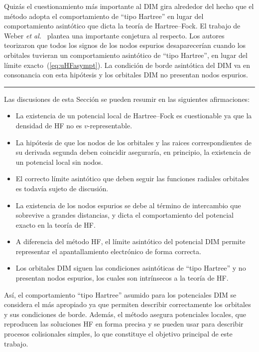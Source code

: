 Quizás el cuestionamiento más importante al DIM gira alrededor del hecho 
que el método adopta el comportamiento de ``tipo Hartree'' en lugar del 
comportamiento asintótico que dicta la teoría de Hartree--Fock. El 
trabajo de Weber \textit{et al.}~\cite{Weber:70} plantea una importante 
conjetura al respecto. Los autores teorizaron que todos los signos de 
los nodos espurios desaparecerían cuando los orbitales tuvieran un 
comportamiento asintótico de ``tipo Hartree'', en lugar del límite 
exacto~(\ref{eq:uHFasympt}). La condición de borde asintótica del DIM 
va en consonancia con esta hipótesis y los orbitales DIM no presentan 
nodos espurios.

\begin{center}
\rule[0.5ex]{0.8\linewidth}{0.5pt}
\end{center}

Las discusiones de esta Sección se pueden resumir en las siguientes 
afirmaciones:
\begin{itemize}
\item La existencia de un potencial local de Hartree--Fock es 
cuestionable ya que la densidad de HF no es $v$-representable.
\item La hipótesis de que los nodos de los orbitales y las raices 
correspondientes de su derivada segunda deben coincidir aseguraría, en 
principio, la existencia de un potencial local sin nodos.
\item El correcto límite asintótico que deben seguir las funciones 
radiales orbitales es todavía sujeto de discusión. 
\item La existencia de los nodos espurios se debe al término de 
intercambio que sobrevive a grandes distancias, y dicta el 
comportamiento del potencial exacto en la teoría de HF.
\item A diferencia del método HF, el límite asintótico del potencial DIM 
permite representar el apantallamiento electrónico de forma correcta.
\item Los orbitales DIM siguen las condiciones asintóticas de ``tipo 
Hartree'' y no presentan nodos espurios, los cuales son intrínsecos a la 
teoría de HF.
\end{itemize}
Así, el comportamiento ``tipo Hartree'' asumido para los potenciales DIM 
se considera el más apropiado ya que permiten describir correctamente 
los orbitales y sus condiciones de borde. Además, el método asegura 
potenciales locales, que reproducen las soluciones HF en forma precisa
y se pueden usar para describir procesos colisionales simples, lo que 
constituye el objetivo principal de este trabajo.

